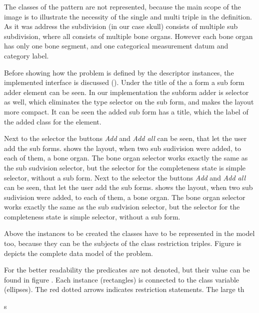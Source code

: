 
The classes of the pattern are not represented, because the main scope of the image is to illustrate the necessity of the single and multi triple in the definition. As it was address the subdivision (in our case skull) consists of multiple sub subdivision, where all consists of multiple bone organs. However each bone organ has only one bone segment, and one categorical measurement datum and category label.

Before showing how the problem is defined by the descriptor instances, the implemented interface is discussed (). Under the title of the a form a sub form adder element can be seen. In our implementation the subform adder is selector as well, which eliminates the type selector on the sub form, and makes the layout more compact. It can be seen the added sub form has a title, which the label of the added class for the element.

Next to the selector the buttons \textit{Add} and \textit{Add all} can be seen, that let the user add the sub forms.  shows the layout, when two sub sudivision were added, to each of them, a bone organ. The bone organ selector works exactly the same as the sub sudvision selector, but the selector for the completeness state is simple selector, without a sub form. 
Next to the selector the buttons \textit{Add} and \textit{Add all} can be seen, that let the user add the sub forms.  shows the layout, when two sub sudivision were added, to each of them, a bone organ. The bone organ selector works exactly the same as the sub sudvision selector, but the selector for the completeness state is simple selector, without a sub form. 



Above the instances to be created the classes have to be represented in the model too, because they can be the subjects of the class restriction triples.
 Figure  is depicts the complete data model of the problem.


For the better readability the predicates are not denoted, but their value can be found in figure . Each instance (rectangles) is connected to the class variable (ellipses). The red dotted arrows indicates restriction statements. The large th

s


